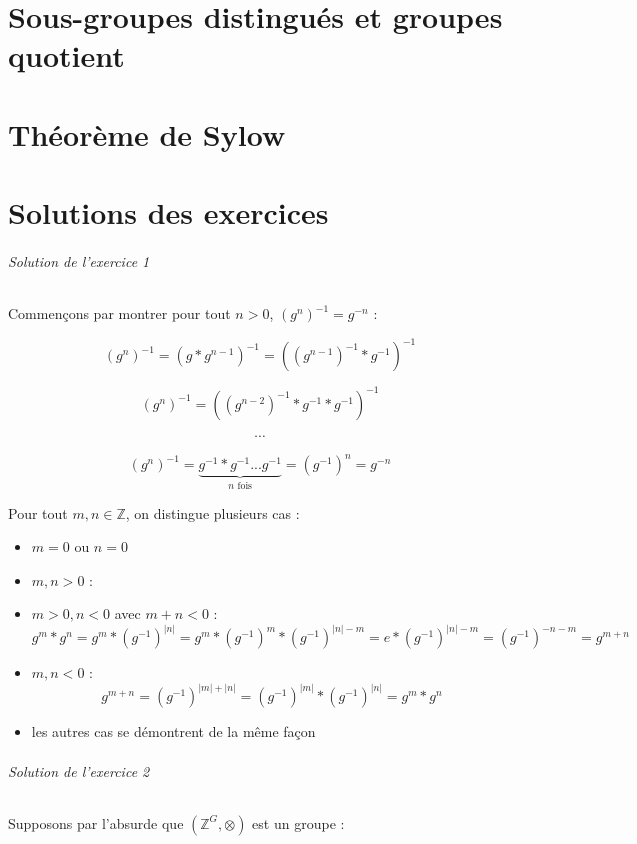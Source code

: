 \documentclass[]{article}
\theoremstyle{remark}
\theoremstyle{definition}
\begin{document}
\part{Sous-groupes distingués et groupes quotient}
\part{Théorème de Sylow}

\part{Solutions des exercices}

\paragraph{Solution de l'exercice 1}

Commençons par montrer pour tout $n > 0$, $( g^n )^{-1} = g^{-n}$ :

$$\left( g^n \right)^{-1} = (g * g^{n-1})^{-1} = ((g^{n-1})^{-1}*g^{-1})^{-1}$$

$$\left( g^n \right)^{-1} = ((g^{n-2})^{-1}*g^{-1}*g^{-1})^{-1}$$

$$\cdots$$

$$\left( g^n \right)^{-1} = \underbrace{g^{-1}*g^{-1} ... g^{-1}}_{n \text{ fois}} = (g^{-1})^n = g^{-n}$$

Pour tout $m, n \in \mathbb{Z}$, on distingue plusieurs cas :
\begin{itemize}
	\item $m = 0$ ou $n = 0$ \checkmark
	\item $m, n > 0$ : \checkmark
	\item $m > 0, n < 0$ avec $m + n < 0$ : $$g^m * g^n = g^m * \left(g^{-1}\right)^{|n|} = g^m*\left(g^{-1}\right)^m*\left(g^{-1}\right)^{|n| - m} = e * \left(g^{-1}\right)^{|n|-m}=\left(g^{-1}\right)^{-n-m}=g^{m+n}$$
	\item $m, n < 0$ : $$g^{m+n}=\left(g^{-1}\right)^{|m|+|n|}=\left(g^{-1}\right)^{|m|}*\left(g^{-1}\right)^{|n|}=g^m*g^n$$
	\item les autres cas se démontrent de la même façon
\end{itemize}

\paragraph{Solution de l'exercice 2}

Supposons par l'absurde que $\left(\mathbb{Z}^G, \otimes\right)$ est un groupe :
\end{document}
